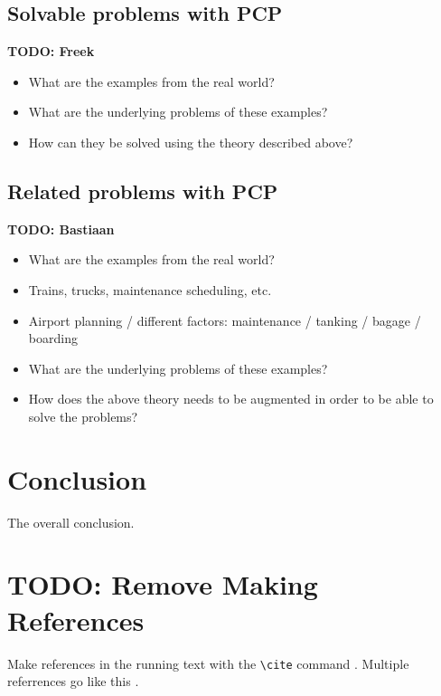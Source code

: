 \documentclass{article}
\newcommand{\TODO}[1]{{\color{red}\textbf{TODO: #1}}}
\begin{document}
\subsection{Solvable problems with PCP}
\TODO{Freek}
\begin{itemize}
\item What are the examples from the real world? 
\item What are the underlying problems of these examples?
\item How can they be solved using the theory described above?
\end{itemize}

\subsection{Related problems with PCP}
\TODO{Bastiaan}
\begin{itemize}
\item What are the examples from the real world?
\item Trains, trucks, maintenance scheduling, etc.
\item Airport planning / different factors: maintenance / tanking / bagage / boarding
\item What are the underlying problems of these examples?
\item How does the above theory needs to be augmented in order to be able to solve the problems?
\end{itemize}

\section{Conclusion}
The overall conclusion.

\section{\TODO{Remove} Making References}

  Make references in the running text with the \verb+\cite+
  command \cite{dijkstra68}. Multiple referrences go like this
  \cite{charniak85,steels98}.




\end{document}
